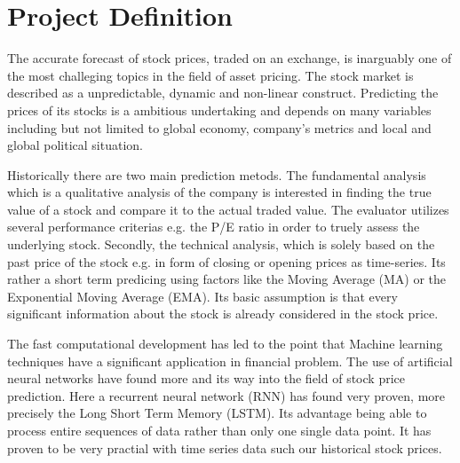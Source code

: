 \documentclass[fleqn,10pt]{SelfArx} %
\affiliation{\textsuperscript{1}\textit{Contact: lucasbr@me.com}} %
\begin{document}
\maketitle %

\tableofcontents %

\thispagestyle{empty} %


\section{Project Definition} %

The accurate forecast of stock prices, traded on an exchange, is inarguably one of the most challeging topics in the field of asset pricing. The stock market is described as a unpredictable, dynamic and non-linear construct. Predicting the prices of its stocks is a ambitious undertaking and depends on many variables including but not limited to global economy, company's metrics and local and global political situation. 

Historically there are two main prediction metods. The fundamental analysis which is a qualitative analysis of the company is interested in finding the true value of a stock and compare it to the actual traded value. The evaluator utilizes several performance criterias e.g. the P/E ratio in order to truely assess the underlying stock. Secondly, the technical analysis, which is solely based on the past price of the stock e.g. in form of closing or opening prices as time-series. Its rather a short term predicing using factors like the Moving Average (MA) or the Exponential Moving Average (EMA). Its basic assumption is that every significant information about the stock is already considered in the stock price.

The fast computational development has led to the point that Machine learning techniques have a significant application in financial problem. The use of artificial neural networks have found more and its way into the field of stock price prediction. Here a recurrent neural network (RNN) has found very proven, more precisely the Long Short Term Memory (LSTM). Its advantage being
able to process entire sequences of data rather than only one single data point. It has proven to be very practial with time series data such our historical stock prices. 
\end{document}
